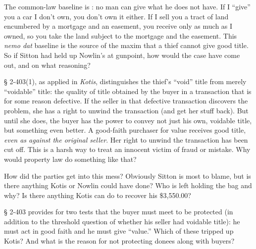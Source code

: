 
\item The common-law baseline is : no man can
give what he does not have. If I ``give'' you a car I don't own, you don't own
it either. If I sell you a tract of land encumbered by a mortgage and an
easement, you receive only as much as I owned, so you take the land subject to
the mortgage and the easement. This \textit{nemo dat} baseline is the source of
the maxim that a thief cannot give good title. So if Sitton had held up
Nowlin's at gunpoint, how would the case have come out, and on what reasoning?

{\S} 2-403(1), as applied in \textit{Kotis}, distinguishes the thief's ``void''
title from merely ``voidable'' title: the quality of title obtained by the
buyer in a transaction that is for some reason defective. If the seller in that
defective transaction discovers the problem, she has a right to unwind the
transaction (and get her stuff back). But until she does, the buyer has the
power to convey not just his own, voidable title, but something even better. A
good-faith purchaser for value receives good title, \textit{even as against the
original seller}. Her right to unwind the transaction has been cut off. This is
a harsh way to treat an innocent victim of fraud or mistake. Why would property
law do something like that?


\item How did the parties get into this mess? Obviously Sitton is most to blame,
but is there anything Kotis or Nowlin could have done? Who is left holding the
bag and why? Is there anything Kotis can do to recover his \$3,550.00?


\item {\S} 2-403 provides for two tests that the buyer must meet to be protected
(in addition to the threshold question of whether his seller had voidable
title): he must act in good faith and he must give ``value.'' Which of these
tripped up Kotis? And what is the reason for not protecting donees along with
buyers? 


